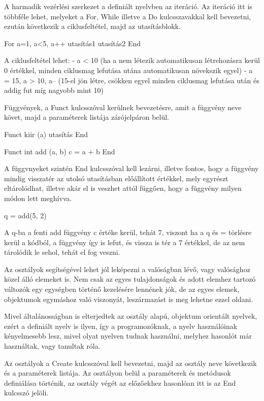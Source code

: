 A harmadik vezérlési szerkezet a definiált nyelvben az iteráció. Az iteráció itt is többféle lehet, melyeket a For, While illetve a Do kulcsszavakkal kell bevezetni, ezután következik a ciklusfeltétel, majd az utasításblokk.

\begin{cpp}
For a=1, a<5, a++
	utasítás1
	utasítás2
End
\end{cpp}

A ciklusfeltétel lehet:
- a < 10 (ha a nem létezik automatikusan létrehozásra kerül 0 értékkel, minden ciklusmag lefutása utána automatikusan növekszik egyel)
- a = 15, a > 10, a-- (15-el jön létre, csökken egyel minden ciklusmag lefutása után és addig fut míg nagyobb mint 10)

Függvények, a Funct kulcsszóval kerülnek bevezetésre, amit a függvény neve követ, majd a paraméterek listája zárójelpáron belül.

\begin{cpp}
Funct kiir (a)
	utasítás
End

Funct int add (a, b)
	c = a + b
End
\end{cpp}

A függvnyeket szintén End kulcsszóval kell lezárni, illetve fontos, hogy a függvény mindig visszatér az utolsó utasításban előállított értékkel, mely egyrészt eltárolódhat, illetve akár el is veszhet attól függően, hogy a függvény milyen módon lett meghívva.

\begin{cpp}
q = add(5, 2)
\end{cpp}

A q-ba a fenti add függvény c értéke kerül, tehát 7, viszont ha a q és = törlésre kerül a kódból, a függvény így is lefut, és vissza is tér a 7 értékkel, de az nem tárolódik le sehol, tehát el fog veszni.

Az osztályok segítségével lehet jól leképezni a valóságban lévő, vagy valósághoz közel álló elemeket is. Nem csak az egyes tulajdonságok és adott elemhez tartozó változók egy egységben történő kezelésére lennének jók, de az egyes elemek, objektumok egymáshoz való viszonyát, leszármazást is meg lehetne ezzel oldani.

Mivel általánosságban is elterjedtek az osztály alapú, objektum orientált nyelvek, ezért a definiált nyelv is ilyen, így a programozóknak, a nyelv használóinak kényelmesebb lesz, mivel olyat nyelven tudnak használni, melyhez hasonlót már használtak, vagy tanultak róla.

Az osztályok a Create kulcsszóval kell bevezetni, majd az osztály neve következik és a paraméterek listája. Az osztályon belül a paraméterek és metódusok definiálása történik, az osztály végét az előzőekhez hasonlóan itt is az End kulcsszó jelöli.


